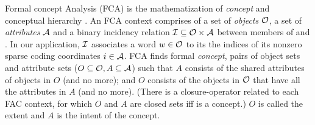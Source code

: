 \documentclass[11pt,a4paper]{article}
\begin{document}
Formal concept Analysis (FCA) is the mathematization of \emph{concept} and conceptual
hierarchy \citep{Ganter:2012,Endres:2010}. %
An FCA context %
comprises of
a set of \emph{objects} $\mathcal O$, a set of \emph{attributes} $\mathcal A$ and
a binary incidency relation $\mathcal I \subseteq \mathcal O \times \mathcal A$
between members of \ob and \at.
In our application, $\mathcal I$ associates a word $w\in\mathcal O$ to its
the indices of its nonzero sparse coding coordinates $i\in\mathcal A$.
FCA finds formal \emph{concept}, pairs \oaconc of object sets and attribute sets
($O\subseteq \mathcal O,A \subseteq \mathcal A$) such that $A$
consists of the shared attributes of objects in $O$ (and no more); and
$O$ consists of
the objects in $\mathcal O$ that have all the attributes in $A$ (and no more).
(There is a closure-operator related to each FAC context, for which $O$ and $A$
are closed sets iff \oaconc is a concept.)
$O$ is called the extent and $A$ is the intent of the concept.
\end{document}
